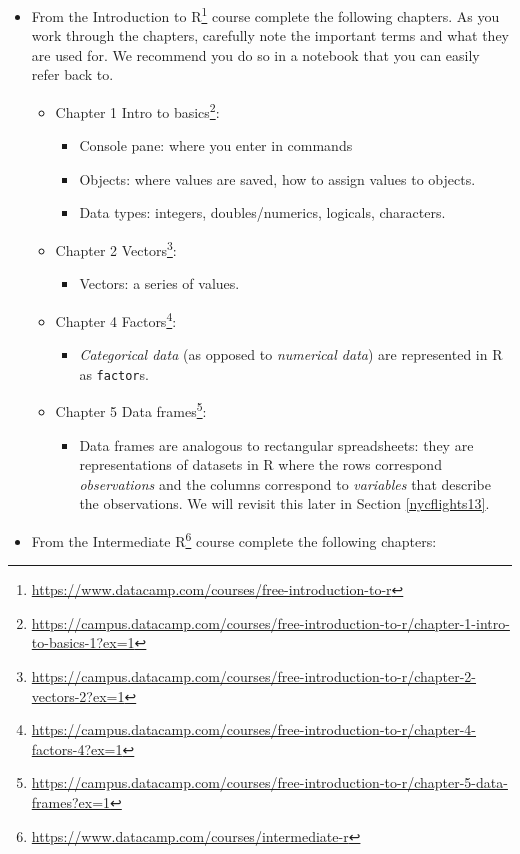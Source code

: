 \documentclass[12pt,]{krantz}
\providecommand{\tightlist}{%
  \setlength{\itemsep}{0pt}\setlength{\parskip}{0pt}}
\renewcommand{\href}[2]{#2\footnote{\url{#1}}}
\theoremstyle{definition}
\theoremstyle{definition}
\theoremstyle{definition}
\theoremstyle{remark}
\begin{document}
\begin{itemize}
\tightlist
\item
  From the
  \href{https://www.datacamp.com/courses/free-introduction-to-r}{Introduction
  to R} course complete the following chapters. As you work through the
  chapters, carefully note the important terms and what they are used
  for. We recommend you do so in a notebook that you can easily refer
  back to.

  \begin{itemize}
  \tightlist
  \item
    \href{https://campus.datacamp.com/courses/free-introduction-to-r/chapter-1-intro-to-basics-1?ex=1}{Chapter
    1 Intro to basics}:

    \begin{itemize}
    \tightlist
    \item
      Console pane: where you enter in commands
    \item
      Objects: where values are saved, how to assign values to objects.
    \item
      Data types: integers, doubles/numerics, logicals, characters.\\
    \end{itemize}
  \item
    \href{https://campus.datacamp.com/courses/free-introduction-to-r/chapter-2-vectors-2?ex=1}{Chapter
    2 Vectors}:

    \begin{itemize}
    \tightlist
    \item
      Vectors: a series of values.
    \end{itemize}
  \item
    \href{https://campus.datacamp.com/courses/free-introduction-to-r/chapter-4-factors-4?ex=1}{Chapter
    4 Factors}:

    \begin{itemize}
    \tightlist
    \item
      \emph{Categorical data} (as opposed to \emph{numerical data}) are
      represented in R as \texttt{factor}s.
    \end{itemize}
  \item
    \href{https://campus.datacamp.com/courses/free-introduction-to-r/chapter-5-data-frames?ex=1}{Chapter
    5 Data frames}:

    \begin{itemize}
    \tightlist
    \item
      Data frames are analogous to rectangular spreadsheets: they are
      representations of datasets in R where the rows correspond
      \emph{observations} and the columns correspond to \emph{variables}
      that describe the observations. We will revisit this later in
      Section \ref{nycflights13}.
    \end{itemize}
  \end{itemize}
\item
  From the
  \href{https://www.datacamp.com/courses/intermediate-r}{Intermediate R}
  course complete the following chapters:


\end{itemize}
\end{document}
